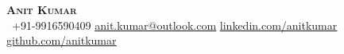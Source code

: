 \begin{center}
    \textbf{\Huge \scshape Anit Kumar} \\ \vspace{1pt}
    \vspace{1em}
     \ \small +91-9916590409 \quad
    \href{mailto:anit.kumar@outlook.com}{ \underline{anit.kumar@outlook.com}} \quad
    \href{https://www.linkedin.com/in/anit-kumar-16880753/}{ \underline{linkedin.com/anitkumar}} \quad
    \href{https://github.com/anitkumar1490}{ \underline{github.com/anitkumar}}
\end{center}